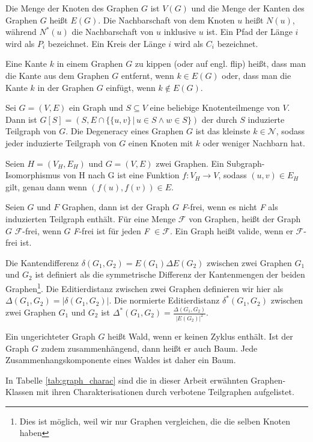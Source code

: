 \documentclass[12pt,a4paper,onecolumn,oneside,titlepage]{article}
\newcommand\cursive[1]{\ensuremath{\mathcal{#1}}}
\begin{document}
Die Menge der Knoten des Graphen $G$ ist $V(G)$ und die Menge der Kanten des Graphen $G$ heißt $E(G)$. Die Nachbarschaft von dem Knoten $u$ heißt $N(u)$, während $N^{*}(u)$ die Nachbarschaft von $u$ inklusive $u$ ist. Ein Pfad der Länge $i$ wird als $P_i$ bezeichnet. Ein Kreis der Länge $i$ wird als $C_i$ bezeichnet.

Eine Kante $k$ in einem Graphen $G$ zu kippen (oder auf engl. flip) heißt, dass man die Kante aus dem Graphen $G$ entfernt, wenn $k \in E(G)$ oder, dass man die Kante $k$ in der Graphen $G$ einfügt, wenn $k \notin E(G)$.
 
Sei $G = (V,E)$ ein Graph und $S \subseteq V$ eine beliebige Knotenteilmenge von $V$. 
Dann ist $G[S] = (S, E \cap \{\{u,v\} \,|\, u \in S \land w \in S\})$ der durch $S$ induzierte Teilgraph von $G$. Die Degeneracy eines Graphen $G$ ist das kleinste $k \in \mathcal{N}$, sodass jeder induzierte Teilgraph von $G$ einen Knoten mit $k$ oder weniger Nachbarn hat.

Seien $H = (V_H,E_H)$ und $G =(V,E)$ zwei Graphen. Ein Subgraph-Isomorphismus von H nach G ist eine Funktion $f : V_H \rightarrow V$, sodass $(u,v) \in E_H $ gilt, genau dann wenn $(f(u),f(v)) \in E$.

Seien $G$ und $F$ Graphen, dann ist der Graph $G$ \textit{F}-frei, wenn es nicht \textit{F} als induzierten Teilgraph enthält. Für eine Menge \cursive{F} von Graphen, heißt der Graph $G$ \cursive{F}-frei, wenn $G$ \textit{F}-frei ist für jeden \textit{F} $\in \cursive{F}$. Ein Graph heißt valide, wenn er \cursive{F}-frei ist. 

Die Kantendifferenz  $\delta(G_1,G_2) = E(G_1) \Delta E(G_2)$ zwischen zwei Graphen $G_1$ und $G_2$ ist definiert als die symmetrische Differenz der Kantenmengen der beiden Graphen\footnote{Dies ist möglich, weil wir nur Graphen vergleichen, die die selben Knoten haben}. Die Editierdistanz zwischen zwei Graphen definieren wir hier als $\Delta(G_1,G_2) = |\delta(G_1,G_2)|$.
Die normierte Editierdistanz $\delta^{*}(G_1,G_2)$ zwischen zwei Graphen $G_1$ und $G_2$ ist  $\Delta^{*}(G_1,G_2) =  \frac{\Delta(G_1,G_2)}{|E(G_2)|^2}$.

Ein ungerichteter Graph $G$ heißt Wald, wenn er keinen Zyklus enthält. Ist der Graph $G$ zudem zusammenhängend, dann heißt er auch Baum. Jede Zusammenhangskomponente eines Waldes ist daher ein Baum.

In Tabelle \ref{tab:graph_charac} sind die in dieser Arbeit erwähnten Graphen-Klassen mit ihren Charakterisationen durch verbotene Teilgraphen aufgelistet.
\end{document}
